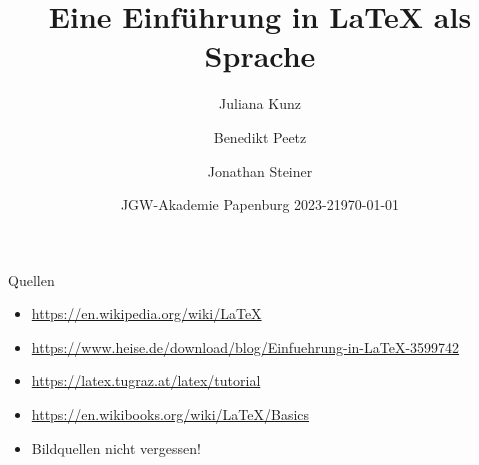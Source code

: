 \documentclass{beamer}
\title[\LaTeX{} Einführung]{Eine Einführung in \LaTeX{} als Sprache}
\author[Juliana, Benedikt, Jonathan]{Juliana Kunz \and Benedikt Peetz \and Jonathan Steiner}
\date[JGW 2023-2]{JGW-Akademie Papenburg 2023-2}
\date{\today}
\begin{document}
    \maketitle

    
    
    

    \begin{frame}{Quellen}

        \small

        \begin{itemize}
            \item \url{https://en.wikipedia.org/wiki/LaTeX}
            \item \url{https://www.heise.de/download/blog/Einfuehrung-in-LaTeX-3599742}
            \item \url{https://latex.tugraz.at/latex/tutorial}
            \item \url{https://en.wikibooks.org/wiki/LaTeX/Basics}
            \item Bildquellen nicht vergessen!
        \end{itemize}
    \end{frame}
\end{document}

